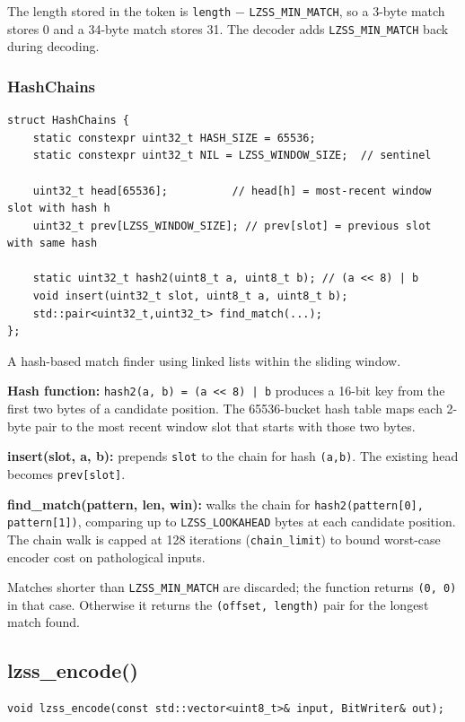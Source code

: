 The length stored in the token is \texttt{length} $-$ \texttt{LZSS\_MIN\_MATCH},
so a 3-byte match stores 0 and a 34-byte match stores 31.
The decoder adds \texttt{LZSS\_MIN\_MATCH} back during decoding.

\subsubsection{HashChains}

\begin{lstlisting}[style=cpp]
struct HashChains {
    static constexpr uint32_t HASH_SIZE = 65536;
    static constexpr uint32_t NIL = LZSS_WINDOW_SIZE;  // sentinel

    uint32_t head[65536];          // head[h] = most-recent window slot with hash h
    uint32_t prev[LZSS_WINDOW_SIZE]; // prev[slot] = previous slot with same hash

    static uint32_t hash2(uint8_t a, uint8_t b); // (a << 8) | b
    void insert(uint32_t slot, uint8_t a, uint8_t b);
    std::pair<uint32_t,uint32_t> find_match(...);
};
\end{lstlisting}

A hash-based match finder using linked lists within the sliding window.

\textbf{Hash function:} \texttt{hash2(a, b) = (a << 8) | b} produces a 16-bit key
from the first two bytes of a candidate position.
The 65536-bucket hash table maps each 2-byte pair to the most recent window slot
that starts with those two bytes.

\textbf{insert(slot, a, b):} prepends \texttt{slot} to the chain for hash \texttt{(a,b)}.
The existing head becomes \texttt{prev[slot]}.

\textbf{find\_match(pattern, len, win):} walks the chain for
\texttt{hash2(pattern[0], pattern[1])}, comparing up to \texttt{LZSS\_LOOKAHEAD}
bytes at each candidate position.
The chain walk is capped at 128 iterations (\texttt{chain\_limit}) to bound worst-case
encoder cost on pathological inputs.

Matches shorter than \texttt{LZSS\_MIN\_MATCH} are discarded; the function returns
\texttt{(0, 0)} in that case.
Otherwise it returns the \texttt{(offset, length)} pair for the longest match found.

\subsection{lzss\_encode()}

\begin{lstlisting}[style=cpp]
void lzss_encode(const std::vector<uint8_t>& input, BitWriter& out);
\end{lstlisting}

